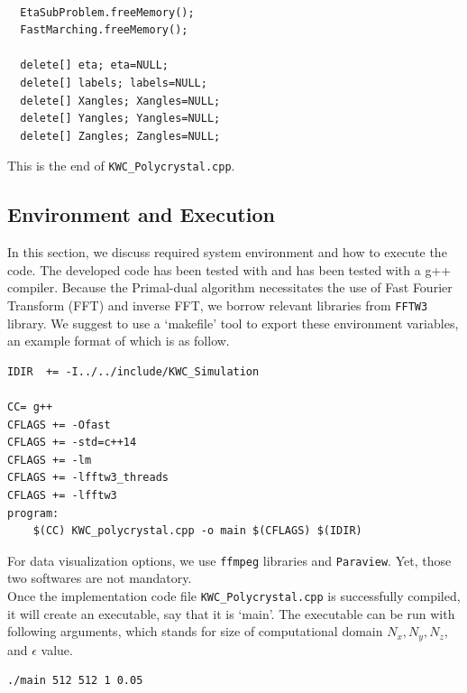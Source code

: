 \documentclass[11pt]{article}
\begin{document}
\begin{tcolorbox}
\begin{lstlisting}[basicstyle=\footnotesize]

  EtaSubProblem.freeMemory();
  FastMarching.freeMemory();
  
  delete[] eta; eta=NULL;
  delete[] labels; labels=NULL;
  delete[] Xangles; Xangles=NULL;
  delete[] Yangles; Yangles=NULL;
  delete[] Zangles; Zangles=NULL;
\end{lstlisting}
\end{tcolorbox}

This is the end of \texttt{KWC\_Polycrystal.cpp}. 


\subsection{Environment and Execution}

In this section, we discuss required system environment 
and how to execute the code.
The developed code has been tested with 
and has been tested with a g++ compiler. 
Because the Primal-dual algorithm necessitates the use of 
Fast Fourier Transform (FFT) and inverse FFT,
we borrow relevant libraries from \texttt{FFTW3} library. 
We suggest to use a `makefile' tool to export these environment variables, 
an example format of which is as follow.\\

\begin{tcolorbox}[colback=white]
\begin{lstlisting}[basicstyle=\footnotesize]
IDIR  += -I../../include/KWC_Simulation

CC= g++
CFLAGS += -Ofast
CFLAGS += -std=c++14
CFLAGS += -lm
CFLAGS += -lfftw3_threads
CFLAGS += -lfftw3
program: 
	$(CC) KWC_polycrystal.cpp -o main $(CFLAGS) $(IDIR)
\end{lstlisting}
\end{tcolorbox}

For data visualization options, 
we use \texttt{ffmpeg} libraries and \texttt{Paraview}. 
Yet, those two softwares are not mandatory. \\

Once the implementation code file \texttt{KWC\_Polycrystal.cpp} 
is successfully compiled, it will create an executable, 
say that it is `main'. The executable can be run with following arguments, 
which stands for size of computational domain $N_x,N_y,N_z$, 
and $\epsilon$ value. 
 
\begin{tcolorbox}[colback=white]
\begin{lstlisting}[basicstyle=\footnotesize]
./main 512 512 1 0.05
\end{lstlisting}
\end{tcolorbox}
\end{document}
